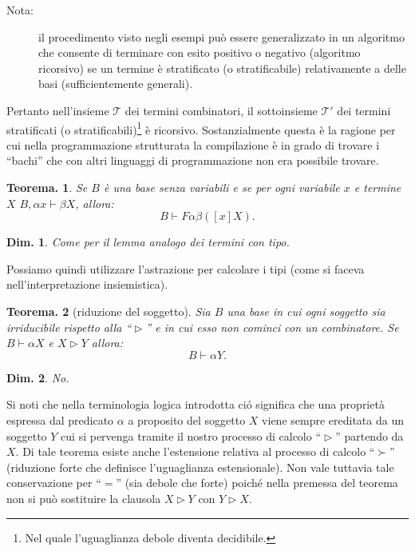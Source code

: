 \documentclass{book}
\newtheorem{teorema}{Teorema.}[chapter]
\newtheorem{dimostrazione}{Dim.}[chapter]
\newcommand*{\asse}{\vdash\!\!           }
\begin{document}
\begin{description}
\item[Nota: ]il procedimento visto negli esempi pu\`o essere generalizzato
in un algoritmo che consente di terminare con esito positivo o negativo 
(algoritmo ricorsivo) se un termine \`e stratificato (o stratificabile) 
relativamente a delle basi (sufficientemente generali).
\end{description}

Pertanto nell'insieme $\mathcal{T}$ dei termini combinatori, il sottoinsieme
$\mathcal{T'}$ dei termini stratificati (o stratificabili)\footnote{Nel quale
l'uguaglianza debole diventa decidibile.} \`e ricorsivo. Sostanzialmente questa
\`e la ragione per cui nella programmazione strutturata la compilazione 
\`e in grado di trovare i ``bachi'' che con altri linguaggi di programmazione 
non era possibile trovare.

\begin{teorema}
Se $B$ \`e una base senza variabili e se per ogni variabile $x$ e termine $X$
$ B, \alpha x \asse \beta X$,
allora:
\[ B \asse F\alpha\beta([x]X). \]
\end{teorema}
\begin{dimostrazione}
Come per il lemma analogo dei termini con tipo.
\end{dimostrazione}
Possiamo quindi utilizzare l'astrazione per calcolare i tipi (come si faceva
nell'interpretazione insiemistica).

\begin{teorema}[riduzione del soggetto]
Sia $B$ una base in cui ogni soggetto sia irriducibile rispetto alla 
``$\vartriangleright$'' e in cui esso non cominci con un combinatore.
Se $B \asse \alpha X$ e $X \vartriangleright Y$ allora:
\[ B \asse \alpha Y. \]
\end{teorema}
\begin{dimostrazione}
No.
\end{dimostrazione}

Si noti che nella terminologia logica introdotta ci\'o significa che una 
propriet\`a espressa dal predicato $\alpha$ a proposito del soggetto $X$ viene
sempre ereditata da un soggetto $Y$ cui si pervenga tramite il nostro processo
di calcolo ``$\vartriangleright$'' partendo da $X$.
Di tale teorema esiste anche l'estensione relativa al processo di calcolo
``$\succ$'' (riduzione forte che definisce l'uguaglianza estensionale). Non
vale tuttavia tale conservazione per ``$=$'' (sia debole che forte) poich\'e 
nella premessa del teorema non si pu\`o sostituire la clausola 
$X \vartriangleright Y$ con $Y \vartriangleright X$.
\end{document}
